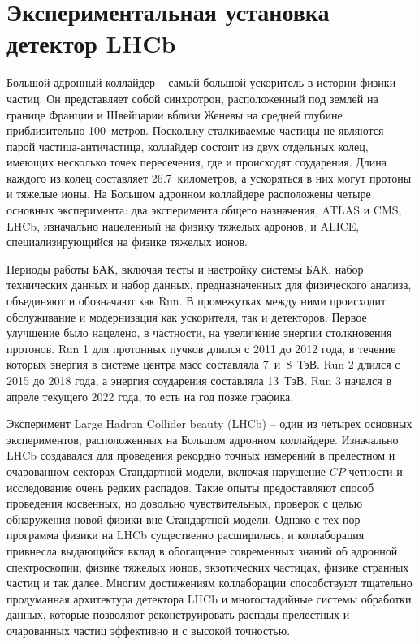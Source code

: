 \clearpage
\section{Экспериментальная установка -- детектор
\uppercase{LHC}\lowercase{b}}
\label{sec:detector}

Большой адронный коллайдер -- самый большой ускоритель в истории физики 
частиц. Он представляет собой синхротрон, расположенный под землей на 
границе Франции и Швейцарии вблизи Женевы на средней глубине 
приблизительно 100~метров. Поскольку сталкиваемые частицы не являются 
парой частица-античастица, коллайдер состоит из двух отдельных колец, 
имеющих несколько точек пересечения, где и происходят соударения. Длина 
каждого из колец составляет 26.7~километров, а ускоряться в них могут 
протоны и тяжелые ионы. На Большом адронном коллайдере расположены 
четыре основных эксперимента: два эксперимента общего назначения, ATLAS 
и CMS, LHCb, изначально нацеленный на физику тяжелых адронов, и ALICE, 
специализирующийся на физике тяжелых ионов.

Периоды работы БАК, включая тесты и настройку системы БАК, набор 
технических данных и набор данных, предназначенных для физического 
анализа, объединяют и обозначают как Run. В промежутках между ними 
происходит обслуживание и модернизация как ускорителя, так и детекторов. 
Первое улучшение было нацелено, в частности, на увеличение энергии 
столкновения протонов. Run 1 для протонных пучков длился с 2011 до 2012 
года, в течение которых энергия в системе центра масс составляла 
7~и~8~ТэВ. Run 2 длился с 2015 до 2018 года, а энергия соударения 
составляла 13~ТэВ. Run 3 начался в апреле текущего 2022 года, то есть на 
год позже графика.

Эксперимент Large Hadron Collider beauty (LHCb) -- один из четырех 
основных экспериментов, расположенных на Большом адронном коллайдере. 
Изначально LHCb создавался для проведения рекордно точных измерений 
в прелестном и очарованном секторах Стандартной модели, включая 
нарушение $CP$-четности и исследование очень редких распадов. Такие 
опыты предоставляют способ проведения косвенных, но довольно 
чувствительных, проверок с целью обнаружения новой физики вне 
Стандартной модели. Однако с тех пор программа физики на LHCb 
существенно расширилась, и коллаборация привнесла выдающийся вклад 
в обогащение современных знаний об адронной спектроскопии, физике 
тяжелых ионов, экзотических частицах, физике странных частиц и так 
далее. Многим достижениям коллаборации способствуют тщательно 
продуманная архитектура детектора LHCb и многостадийные системы 
обработки данных, которые позволяют реконструировать распады прелестных 
и очарованных частиц эффективно и с высокой точностью.

